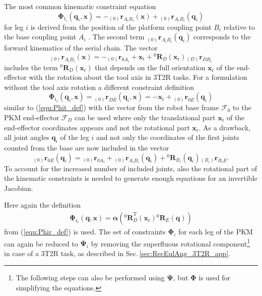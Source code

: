 \documentclass{svproc}
\newcommand{\bm}[1]{\boldsymbol{#1}}
\newcommand{\ortvek}[4]{{ }_{(#1)}{\boldsymbol{#2}}^{#3}_{#4} }
\newcommand{\rotmat}[2]{{{ }^{#1}\boldsymbol{R}}_{#2}}
\newcommand{\transp}[0]{{\mathrm{T}}}
\newcommand{\ks}[1]{{\mathcal{F}}_{#1}}
\begin{document}
The most common kinematic constraint equation 
%
\begin{equation}
\bm{\Phi}_{\mathrm{t}_i}(\bm{q}_i,\bm{x}) = - \ortvek{0}{r}{}{A_iB_i}(\bm{x}) + \ortvek{0}{r}{}{A_iB_i}(\bm{q}_i) 
\end{equation}
%
for leg $i$ is derived from the position of the platform coupling point $B_i$ relative to the base coupling point $A_i$ \cite{Merlet2006}.
The second term $\ortvek{0}{r}{}{A_iB_i}(\bm{q}_i)$ corresponds to the forward kinematics of the serial chain. 
The vector
\begin{equation}
\ortvek{0}{r}{}{A_iB_i}(\bm{x}) = 
- \ortvek{0}{r}{}{0A_i}
+ \bm{x}_{\mathrm{t}} + \rotmat{0}{D}(\bm{x}_{\mathrm{r}}) \ortvek{D}{r}{}{DB_i}
\end{equation}
%
includes the term $\rotmat{0}{D}(\bm{x}_{\mathrm{r}})$ that depends on the full  orientation $\bm{x}_{\mathrm{r}}$ of the end-effector with the rotation about the tool axis in 3T2R tasks.
For a formulation without the tool axis rotation a different constraint definition
%
\begin{equation}
\bm{\Phi}_{\mathrm{t}_i}(\bm{q}_i,\bm{x}) = 
\ortvek{0}{r}{}{DE}(\bm{q}_i,\bm{x}) =
- \bm{x}_{\mathrm{t}} + \ortvek{0}{r}{}{0E}(\bm{q}_i) 
\end{equation}
%
similar to (\ref{equ:Phit_def}) with the vector from the robot base frame $\ks{0}$ to the PKM end-effector $\ks{D}$ can be used where 
only the translational part $\bm{x}_{\mathrm{t}}$ of the end-effector coordinates appears and not the rotational part $\bm{x}_{\mathrm{r}}$.
As a drawback, all joint angles $\bm{q}_i$ of the leg $i$ and not only the coordinates of the first joints counted from the base are now included
in the vector
%
\begin{equation}
\ortvek{0}{r}{}{0E}(\bm{q}_i) = 
\ortvek{0}{r}{}{0A_i}
+ \ortvek{0}{r}{}{A_iB_i}(\bm{q}_i) + \rotmat{0}{B_i}(\bm{q}_i) \ortvek{B_i}{r}{}{B_iE}.
\end{equation}
%
To account for the increased number of included joints, also the rotational part of the kinematic constraints is needed to generate enough equations for an invertible Jacobian.

Here again the definition 
%
\begin{align}
\bm{\Phi}_{\mathrm{r}_i}(\bm{q},\bm{x})
=\bm{\alpha}\left(\rotmat{0}{D}^\transp (\bm{x}_{\mathrm{r}})\rotmat{0}{E}(\bm{q})\right)
\end{align}
%
from (\ref{equ:Phir_def}) is used.
The set of constraints $\bm{\Phi}_{i}$ for each leg of the PKM can again be reduced to $\bm{\Psi}_{i}$ by removing the superfluous rotational component\footnote{The following steps can also be performed using $\bm{\Psi}$, but $\bm{\Phi}$ is used for simplifying the equations.} in case of a 3T2R task, as described in Sec.\,\ref{sec:RecEulAng_3T2R_app}.
\end{document}
